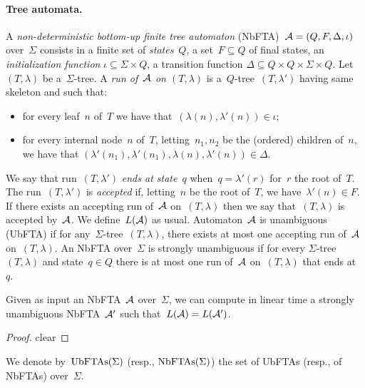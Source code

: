 \paragraph*{Tree automata.}
A \emph{non-deterministic bottom-up finite tree automaton} (NbFTA)~$\mathcal{A} =
(Q,F,\Delta,\iota)$ over~$\Sigma$ consists in a finite set of
\emph{states}~$Q$, a set~$F \subseteq Q$ of final states, an
\emph{initialization function} $\iota \subseteq \Sigma \times Q$, a transition
function $\Delta \subseteq Q \times Q \times \Sigma \times Q$.
Let~$(T,\lambda)$ be a~$\Sigma$-tree.  A \emph{run of~$\mathcal{A}$ on $(T,\lambda)$} is
a~$Q$-tree~$(T,\lambda')$ having same skeleton and such that:
\begin{itemize}
  \item for every leaf~$n$ of~$T$ we have that~$(\lambda(n),\lambda'(n))\in \iota$;
  \item for every internal node~$n$ of~$T$, letting~$n_1,n_2$ be the (ordered) children of~$n$,
        we have that $(\lambda'(n_1),\lambda'(n_1),\lambda(n),\lambda'(n)) \in \Delta$.
\end{itemize}
We say that run~$(T,\lambda')$ \emph{ends at state~$q$} when~$q = \lambda'(r)$
for~$r$ the root of~$T$.  The run~$(T,\lambda')$ is \emph{accepted} if,
letting~$n$ be the root of~$T$, we have~$\lambda'(n)\in F$. If there exists an
accepting run of~$\mathcal{A}$ on~$(T,\lambda)$ then we say that~$(T,\lambda)$ is
accepted by~$\mathcal{A}$. We define~$L(\mathcal{A})$ as usual. Automaton~$\mathcal{A}$ is unambiguous (UbFTA) if
for any~$\Sigma$-tree~$(T,\lambda)$, there exists at most one accepting run
of~$\mathcal{A}$ on~$(T,\lambda)$.
An NbFTA over~$\Sigma$ is strongly unambiguous if for every
$\Sigma$-tree~$(T,\lambda)$ and state~$q \in Q$ there is at most one run
of~$\mathcal{A}$ on~$(T,\lambda)$ that ends at~$q$.

\begin{lemma}
\label{lem:strong-uamb-trees}
Given as input an NbFTA~$\mathcal{A}$ over~$\Sigma$, we can compute
in linear time a strongly unambiguous NbFTA~$\mathcal{A}'$ such that~$L(\mathcal{A}) =
L(\mathcal{A}')$.
\end{lemma}
\begin{proof}
 clear 
\end{proof}

We denote by~$\textrm{UbFTAs}(\Sigma)$ (resp., $\textrm{NbFTAs}(\Sigma)$) the set of UbFTAs (resp., of NbFTAs) over~$\Sigma$.
